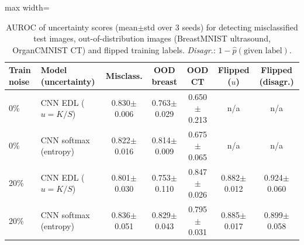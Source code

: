 \begin{table}[t]
\centering
\small
\caption{AUROC of uncertainty scores (mean$\pm$std over 3 seeds) for detecting misclassified test images, out-of-distribution images (BreastMNIST ultrasound, OrganCMNIST CT) and flipped training labels. \emph{Disagr.}: $1-\hat p(\text{given label})$.}
\label{tab:uncertainty}
\begin{adjustbox}{max width=\textwidth}
\begin{tabular}{llccccc}
\toprule
Train noise & Model (uncertainty) & Misclass. & OOD breast & OOD CT & Flipped ($u$) & Flipped (disagr.) \\
\midrule
0\% & CNN EDL ($u=K/S$) & 0.830$\pm$0.006 & 0.763$\pm$0.029 & 0.650$\pm$0.213 & n/a & n/a \\
0\% & CNN softmax (entropy) & 0.822$\pm$0.016 & 0.814$\pm$0.009 & 0.675$\pm$0.065 & n/a & n/a \\
20\% & CNN EDL ($u=K/S$) & 0.801$\pm$0.030 & 0.753$\pm$0.110 & 0.847$\pm$0.026 & 0.882$\pm$0.012 & 0.924$\pm$0.060 \\
20\% & CNN softmax (entropy) & 0.836$\pm$0.051 & 0.829$\pm$0.043 & 0.795$\pm$0.031 & 0.885$\pm$0.017 & 0.899$\pm$0.058 \\
\bottomrule
\end{tabular}
\end{adjustbox}
\end{table}
